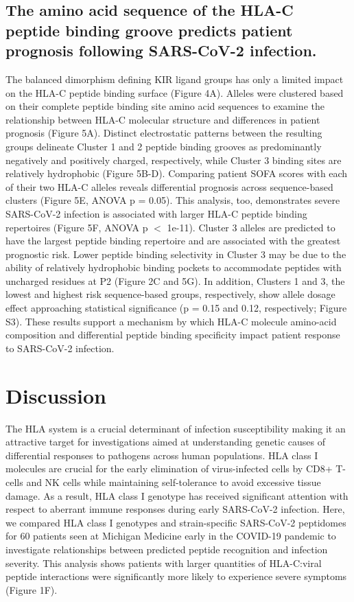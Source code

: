 \documentclass[utf8]{frontiersinFPHY_FAMS} %
\begin{document}
\subsection*{The amino acid sequence of the HLA-C peptide binding groove predicts patient prognosis following SARS-CoV-2 infection.} The balanced dimorphism defining KIR ligand groups has only a limited impact on the HLA-C peptide binding surface (Figure 4A). Alleles were clustered based on their complete peptide binding site amino acid sequences to examine the relationship between HLA-C molecular structure and differences in patient prognosis (Figure 5A). Distinct electrostatic patterns between the resulting groups delineate Cluster 1 and 2 peptide binding grooves as predominantly negatively and positively charged, respectively, while Cluster 3 binding sites are relatively hydrophobic (Figure 5B-D). Comparing patient SOFA scores with each of their two HLA-C alleles reveals differential prognosis across sequence-based clusters (Figure 5E, ANOVA p = 0.05). This analysis, too, demonstrates severe SARS-CoV-2 infection is associated with larger HLA-C peptide binding repertoires (Figure 5F, ANOVA p $<$ 1e-11). Cluster 3 alleles are predicted to have the largest peptide binding repertoire and are associated with the greatest prognostic risk. Lower peptide binding selectivity in Cluster 3 may be due to the ability of relatively hydrophobic binding pockets to accommodate peptides with uncharged residues at P2 (Figure 2C and 5G). In addition, Clusters 1 and 3, the lowest and highest risk sequence-based groups, respectively, show allele dosage effect approaching statistical significance (p = 0.15 and 0.12, respectively; Figure S3). These results support a mechanism by which HLA-C molecule amino-acid composition and differential peptide binding specificity impact patient response to SARS-CoV-2 infection.

\section*{Discussion}

The HLA system is a crucial determinant of infection susceptibility making it an attractive target for investigations aimed at understanding genetic causes of differential responses to pathogens across human populations. HLA class I molecules are crucial for the early elimination of virus-infected cells by CD8+ T-cells and NK cells while maintaining self-tolerance to avoid excessive tissue damage. As a result, HLA class I genotype has received significant attention with respect to aberrant immune responses during early SARS-CoV-2 infection. Here, we compared HLA class I genotypes and strain-specific SARS-CoV-2 peptidomes for 60 patients seen at Michigan Medicine early in the COVID-19 pandemic to investigate relationships between predicted peptide recognition and infection severity. This analysis shows patients with larger quantities of HLA-C:viral peptide interactions were significantly more likely to experience severe symptoms (Figure 1F). 
\end{document}
